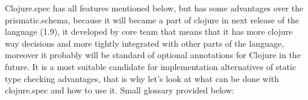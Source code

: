 Clojure.spec has all features mentioned below, but has some advantages over the
prismatic.schema, because it will became a part of clojure in next release of
the language (1.9), it developed by core team that means that it has more
clojure way decisions and more tightly integrated with other parts of the
language, moreover it probably will be standard of optional annotations for
Clojure in the future. It is a most suitable candidate for implementation
alternatives of static type checking advantages, that is why let's look at what
can be done with clojure.spec and how to use it. Small glossary provided below:



